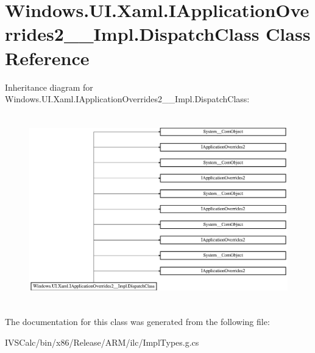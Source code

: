 \hypertarget{class_windows_1_1_u_i_1_1_xaml_1_1_i_application_overrides2_____impl_1_1_dispatch_class}{}\section{Windows.\+U\+I.\+Xaml.\+I\+Application\+Overrides2\+\_\+\+\_\+\+Impl.\+Dispatch\+Class Class Reference}
\label{class_windows_1_1_u_i_1_1_xaml_1_1_i_application_overrides2_____impl_1_1_dispatch_class}
Inheritance diagram for Windows.\+U\+I.\+Xaml.\+I\+Application\+Overrides2\+\_\+\+\_\+\+Impl.\+Dispatch\+Class\+:\begin{figure}[H]
\begin{center}
\leavevmode
\includegraphics[height=8.301887cm]{class_windows_1_1_u_i_1_1_xaml_1_1_i_application_overrides2_____impl_1_1_dispatch_class}
\end{center}
\end{figure}


The documentation for this class was generated from the following file\+:\begin{DoxyCompactItemize}
\item 
I\+V\+S\+Calc/bin/x86/\+Release/\+A\+R\+M/ilc/Impl\+Types.\+g.\+cs\end{DoxyCompactItemize}
